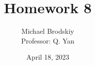 


\title{Homework 8}
\date{April 18, 2023}
\author{Michael Brodskiy\\ \small Professor: Q. Yan}



\maketitle

\newpage

